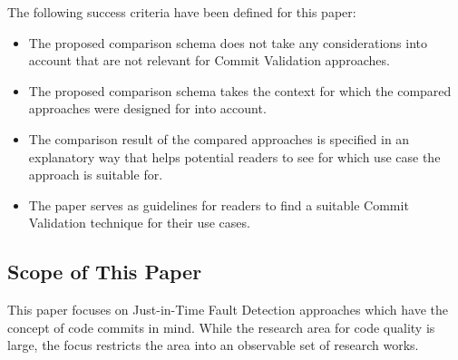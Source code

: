 The following success criteria have been defined for this paper: 

\begin{itemize}
	\item The proposed comparison schema does not take any considerations into account that are not relevant for Commit Validation approaches.
	\item The proposed comparison schema takes the context for which the compared approaches were designed for into account.
	\item The comparison result of the compared approaches is specified in an explanatory way that helps potential readers to see for which use case the approach is suitable for.
	\item The paper serves as guidelines for readers to find a suitable Commit Validation technique for their use cases.
\end{itemize}



\subsection{Scope of This Paper}
\label{sec:scope}


This paper focuses on Just-in-Time Fault Detection approaches which have the concept of code commits in mind. 
While the research area for code quality is large, the focus restricts the area into an observable set of research works.

